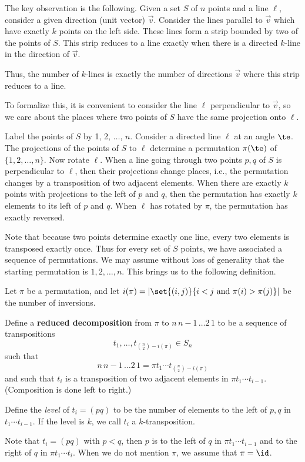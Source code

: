 \documentclass[12pt, reqno]{amsart}
\begin{document}
The key observation is the following. Given a set $S$ of $n$ points and a line $\ell$, consider a given direction (unit vector) $\vec v$. Consider the lines parallel to $\vec v$ which have exactly $k$ points on the left side. These lines form a strip bounded by two of the points of $S$. This strip reduces to a line exactly when there is a directed $k$-line in the direction of $\vec v$.

Thus, the number of $k$-lines is exactly the number of directions  $\vec v$ where this strip reduces to a line.

To formalize this, it is convenient to consider the line $\ell$ perpendicular to $\vec v$, so we care about the places where two points of $S$ have the same projection onto $\ell$.

Label the points of $S$ by 1, 2, $\ldots$, $n$. Consider a directed line $\ell$ at an angle $\te$. The projections of the points of $S$ to $\ell$ determine a permutation $\pi(\te)$ of $\{1,2,\ldots, n\}$. Now rotate $\ell$. When a line going through two points $p,q$ of $S$ is perpendicular to $\ell$, then their projections change places, i.e., the permutation changes by a transposition of two adjacent elements. When there are exactly $k$ points with projections to the left of $p$ and $q$, then the permutation has exactly $k$ elements to its left of $p$ and $q$. When $\ell$ has rotated by $\pi$, the permutation has exactly reversed.

Note that because two points determine exactly one line, every two elements is transposed exactly once. Thus for every set of $S$ points, we have associated a sequence of permutations. We may assume without loss of generality that the starting permutation is $1,2,\ldots, n$. This brings us to the following definition.
\begin{df}
Let $\pi$ be a permutation, and let $i(\pi)=|\set{(i,j)}{i<j\text{ and }\pi(i)>\pi(j)}|$ be the number of inversions.

Define a \textbf{reduced decomposition} from $\pi$ to $n\,n-1\,\ldots 2\,1$ to be a sequence of transpositions
\[
t_1,\ldots, t_{\binom n2-i(\pi)}\in S_n
\]
such that
\[
n\,n-1\,\ldots 2\,1=\pi t_1\cdots t_{\binom n2-i(\pi)}
\]
and such that $t_{i}$ is a transposition of two adjacent elements in $\pi t_1\cdots t_{i-1}$. (Composition is done left to right.)

Define the {\it level} of $t_i=(pq)$ to be the number of elements to the left of $p,q$ in $t_1\cdots t_{i-1}$. If the level is $k$, we call $t_i$ a $k$-transposition.
\end{df}
Note that $t_i=(pq)$ with $p<q$, then $p$ is to the left of $q$ in $\pi t_1\cdots t_{i-1}$ and to the right of $q$ in $\pi t_1\cdots t_i$. When we do not mention $\pi$, we assume that $\pi=\id$.
\end{document}
